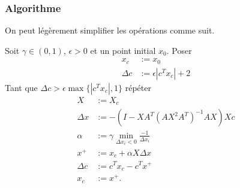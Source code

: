 \documentclass[t,usepdftitle=false]{beamer}
\begin{document}
\begin{frame}
	\frametitle{Algorithme}
	
	On peut légèrement simplifier les opérations comme suit.
	
	Soit $\gamma \in (0,1)$, $\epsilon > 0$ et un point initial $x_0$.
	Poser
	\begin{align*}
		x_c &:= x_0 \\
		\Delta c &:= \epsilon|c^Tx_c|+2
	\end{align*}
	Tant que $\Delta c > \epsilon\max\{|c^Tx_c|,1\}$ répéter
	\begin{align*}
		X &:= X_c \\
		\Delta x &:= -(I - XA^T(AX^2A^T)^{-1}AX)Xc \\
		\alpha &:= \gamma \min_{\Delta x_i < 0} \frac{-1}{\Delta x_i} \\
		x^+ &:= x_c + \alpha X \Delta x \\
		\Delta c &:= c^Tx_c - c^Tx^+ \\
		x_c &:= x^+.
	\end{align*}
	
\end{frame}
\end{document}
